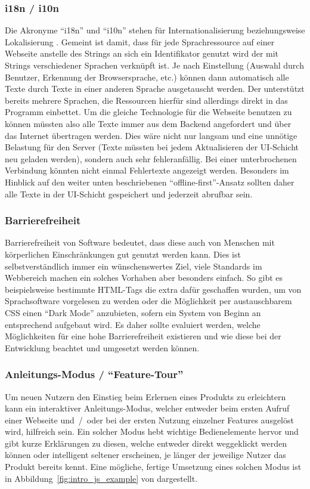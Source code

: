 \subsubsection{i18n / i10n}
Die Akronyme ``i18n'' und ``i10n'' stehen für Internationalisierung beziehungsweise Lokalisierung \parencite{i18n_i10n_ishida_w3c_miller_boeing_2018}. Gemeint ist damit, dass für jede Sprachressource auf einer Webseite anstelle des Strings an sich ein Identifikator genutzt wird der mit Strings verschiedener Sprachen verknüpft ist. Je nach Einstellung (Auswahl durch Benutzer, Erkennung der Browsersprache, etc.) können dann automatisch alle Texte durch Texte in einer anderen Sprache ausgetauscht werden. Der  unterstützt bereits mehrere Sprachen, die Ressourcen hierfür sind allerdings direkt in das Programm einbettet. Um die gleiche Technologie für die Webseite benutzen zu können müssten also alle Texte immer aus dem Backend angefordert und über das Internet übertragen werden. Dies wäre nicht nur langsam und eine unnötige Belastung für den Server (Texte müssten bei jedem Aktualisieren der UI-Schicht neu geladen werden), sondern auch sehr fehleranfällig. Bei einer unterbrochenen Verbindung könnten nicht einmal Fehlertexte angezeigt werden. Besonders im Hinblick auf den weiter unten beschriebenen ``offline-first''-Ansatz sollten daher alle Texte in der UI-Schicht gespeichert und jederzeit abrufbar sein.

\subsubsection{Barrierefreiheit}
Barrierefreiheit von Software bedeutet, dass diese auch von Menschen mit körperlichen Einschränkungen gut genutzt werden kann. Dies ist selbstverständlich immer ein wünschenswertes Ziel, viele Standards im Webbereich machen ein solches Vorhaben aber besonders einfach. So gibt es beispielsweise bestimmte HTML-Tags die extra dafür geschaffen wurden, um von Sprachsoftware vorgelesen zu werden oder die Möglichkeit per austauschbarem CSS einen ``Dark Mode'' anzubieten, sofern ein System von Beginn an entsprechend aufgebaut wird.
Es daher sollte evaluiert werden, welche Möglichkeiten für eine hohe Barrierefreiheit existieren und wie diese bei der Entwicklung beachtet und umgesetzt werden können.

\subsubsection{Anleitungs-Modus / ``Feature-Tour''}
 Um neuen Nutzern den Einstieg beim Erlernen eines Produkts zu erleichtern kann ein interaktiver Anleitungs-Modus, welcher entweder beim ersten Aufruf einer Webseite und~/~oder bei der ersten Nutzung einzelner Features ausgelöst wird, hilfreich sein. Ein solcher Modus hebt wichtige Bedienelemente hervor und gibt kurze Erklärungen zu diesen, welche entweder direkt weggeklickt werden können oder intelligent seltener erscheinen, je länger der jeweilige Nutzer das Produkt bereits kennt. Eine mögliche, fertige Umsetzung eines solchen Modus ist in Abbildung~\ref{fig:intro_js_example} von   dargestellt.

